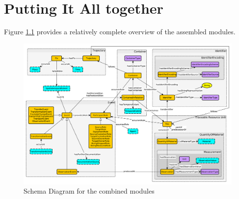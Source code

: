 \chapter{Putting It All together}
\label{chap:all}

Figure \ref{fig:overview} provides a relatively complete overview of the assembled modules.
\begin{figure}[h]
\begin{center}
\includegraphics[width=\textwidth]{diagrams/overview2.pdf}
\end{center}
\caption{Schema Diagram for the combined modules}
\label{fig:overview}
\end{figure}